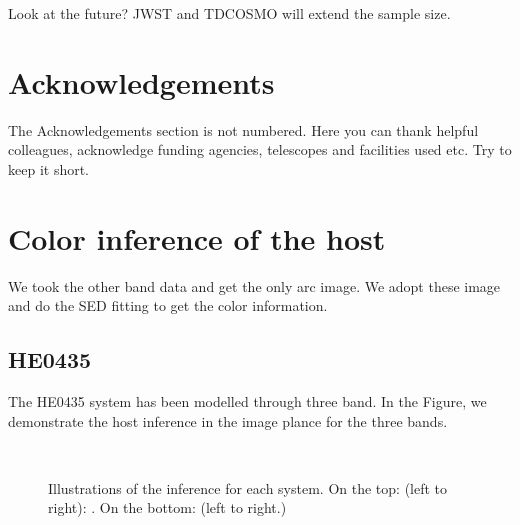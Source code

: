 \documentclass[fleqn,usenatbib]{mnras}
\begin{document}
Look at the future? JWST and TDCOSMO will extend the sample size.


\section*{Acknowledgements}

The Acknowledgements section is not numbered. Here you can thank helpful
colleagues, acknowledge funding agencies, telescopes and facilities used etc.
Try to keep it short.










\appendix

\section{Color inference of the host}
We took the other band data and get the only arc image. We adopt these image and do the SED fitting to get the color information.
\subsection{HE0435}\label{app:HE0435}
The HE0435 system has been modelled through three band. In the Figure, we demonstrate the host inference in the image plance for the three bands. 

\begin{figure}
\centering
{}\\
\caption{\label{fig:app_HE0435} 
Illustrations of the inference for each system. On the top: (left to right): . On the bottom: (left to right.) }
\end{figure} 
\end{document}
